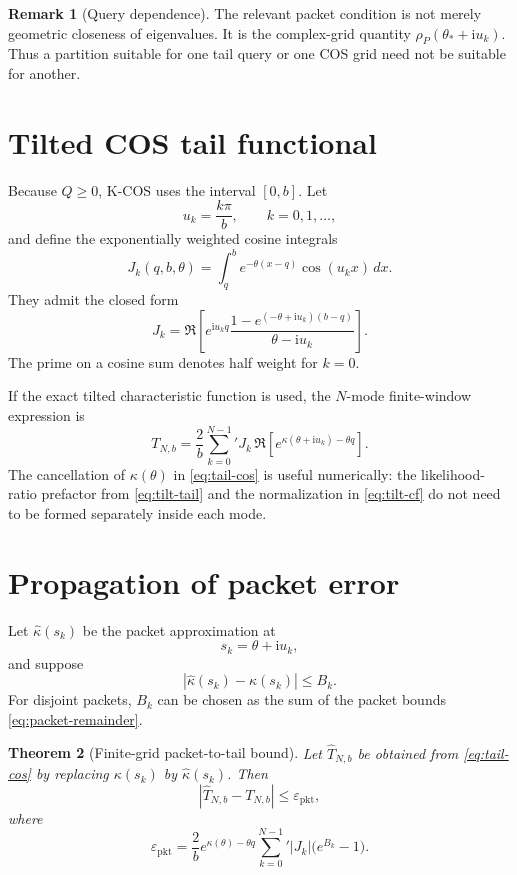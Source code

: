 \documentclass[11pt]{article}
\newtheorem{theorem}{Theorem}[section]
\theoremstyle{definition}
\newtheorem{remark}[theorem]{Remark}
\newcommand{\eps}{\varepsilon}
\newcommand{\ii}{\mathrm{i}}
\begin{document}
\begin{remark}[Query dependence]
The relevant packet condition is not merely geometric closeness of eigenvalues. It is the complex-grid quantity $\rho_P(\theta_*+\ii u_k)$. Thus a partition suitable for one tail query or one COS grid need not be suitable for another.
\end{remark}

\section{Tilted COS tail functional}

Because $Q\ge0$, K-COS uses the interval $[0,b]$. Let
\[
u_k=\frac{k\pi}{b},
\qquad k=0,1,\ldots,
\]
and define the exponentially weighted cosine integrals
\begin{equation}
J_k(q,b,\theta)
=\int_q^b e^{-\theta(x-q)}\cos(u_kx)\,dx.
\label{eq:J-def}
\end{equation}
They admit the closed form
\begin{equation}
J_k
=\Re\left[
 e^{\ii u_k q}
 \frac{1-e^{(-\theta+\ii u_k)(b-q)}}{\theta-\ii u_k}
\right].
\label{eq:J-formula}
\end{equation}
The prime on a cosine sum denotes half weight for $k=0$.

If the exact tilted characteristic function is used, the $N$-mode finite-window expression is
\begin{equation}
T_{N,b}
=\frac{2}{b}\sum_{k=0}^{N-1}{}'
J_k\,
\Re\left[e^{\kappa(\theta+\ii u_k)-\theta q}\right].
\label{eq:tail-cos}
\end{equation}
The cancellation of $\kappa(\theta)$ in \eqref{eq:tail-cos} is useful numerically: the likelihood-ratio prefactor from \eqref{eq:tilt-tail} and the normalization in \eqref{eq:tilt-cf} do not need to be formed separately inside each mode.

\section{Propagation of packet error}

Let $\widehat\kappa(s_k)$ be the packet approximation at
\[
s_k=\theta+\ii u_k,
\]
and suppose
\begin{equation}
|\widehat\kappa(s_k)-\kappa(s_k)|\le B_k.
\label{eq:Bk}
\end{equation}
For disjoint packets, $B_k$ can be chosen as the sum of the packet bounds \eqref{eq:packet-remainder}.

\begin{theorem}[Finite-grid packet-to-tail bound]
\label{thm:packet-tail}
Let $\widehat T_{N,b}$ be obtained from \eqref{eq:tail-cos} by replacing $\kappa(s_k)$ by $\widehat\kappa(s_k)$. Then
\begin{equation}
|\widehat T_{N,b}-T_{N,b}|
\le \eps_{\mathrm{pkt}},
\label{eq:packet-tail-bound}
\end{equation}
where
\begin{equation}
\eps_{\mathrm{pkt}}
=
\frac{2}{b}
 e^{\kappa(\theta)-\theta q}
\sum_{k=0}^{N-1}{}'
|J_k|\bigl(e^{B_k}-1\bigr).
\label{eq:eps-pkt}
\end{equation}
\end{theorem}
\end{document}
